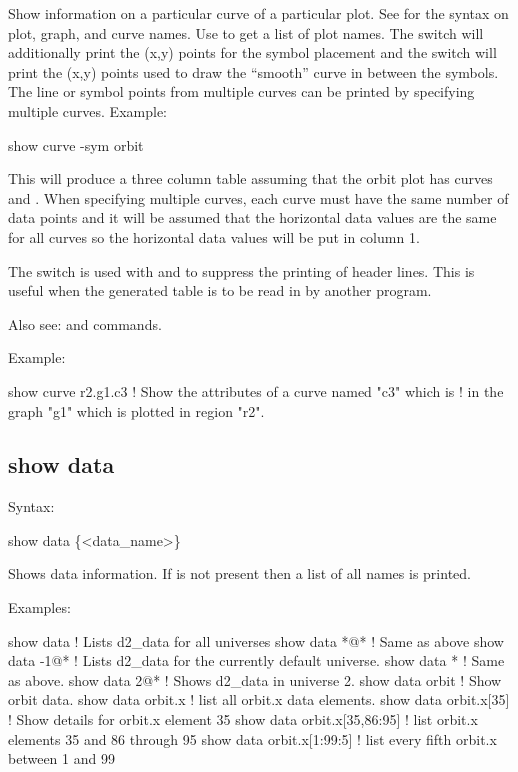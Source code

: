 {{{{{Show information on a particular curve of a particular plot. See  for the
syntax on plot, graph, and curve names.  Use  to get a list of plot
names. The  switch will additionally print the (x,y) points for the symbol
placement and the  switch will print the (x,y) points used to draw the
``smooth'' curve in between the symbols. The line or symbol points from multiple curves
can be printed by specifying multiple curves. Example:
\begin{example}
  show curve -sym orbit
\end{example}
This will produce a three column table assuming that the orbit plot has curves
 and . When specifying multiple curves, each curve must have
the same number of data points and it will be assumed that the horizontal data values are
the same for all curves so the horizontal data values will be put in column 1.

The  switch is used with  and  to suppress the
printing of header lines. This is useful when the generated table is to be read in by
another program.

Also see:  and  commands.

Example:
\begin{example}
  show curve r2.g1.c3     ! Show the attributes of a curve named "c3" which is 
                          !   in the graph "g1" which is plotted in region "r2".
\end{example}


\subsection{show data}
\label{s:show.data}

Syntax:
\begin{example}
  show data \{<data_name>\}
\end{example}

Shows data information. If  is not present then a list of all 
names is printed.

Examples:
\begin{example}
  show data                   ! Lists d2_data for all universes
  show data *@*               ! Same as above
  show data -1@*              ! Lists d2_data for the currently default universe.
  show data *                 ! Same as above.
  show data 2@*               ! Shows d2_data in universe 2.
  show data orbit             ! Show orbit data.
  show data orbit.x           ! list all orbit.x data elements.
  show data orbit.x[35]       ! Show details for orbit.x element 35
  show data orbit.x[35,86:95] ! list orbit.x elements 35 and 86 through 95
  show data orbit.x[1:99:5]   ! list every fifth orbit.x between 1 and 99  
\end{example}

}}}}}
